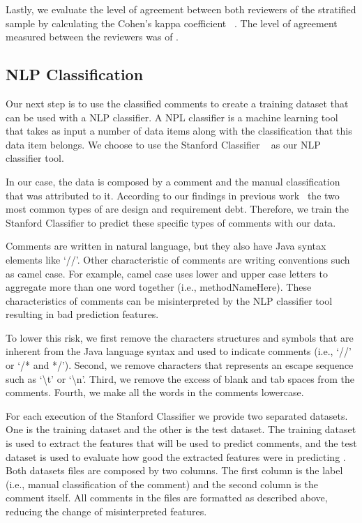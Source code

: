 Lastly, we evaluate the level of agreement between both reviewers of the stratified sample by calculating the Cohen's kappa coefficient ~\cite{cohen1960coefficient}. The level of agreement measured between the reviewers was of \todo{}.   
 

\subsection{NLP Classification} %
\label{sub:run_the_nlp_classifier}


Our next step is to use the classified \SATD comments to create a training dataset that can be used with a NLP classifier. A NPL classifier is a machine learning tool that takes as input a number of data items along with the classification that this data item belongs. We choose to use the Stanford Classifier ~\cite{Manning2014ACL} as our NLP classifier tool. 

In our case, the data is composed by a comment and the manual classification that was attributed to it. According to our findings in previous work~\cite{Maldonado2015MTD} the two most common types of \SATD are design and requirement debt. Therefore, we train the Stanford Classifier to predict these specific types of \SATD comments with our data.

Comments are written in natural language, but they also have Java syntax elements like `//'. Other characteristic of comments are writing conventions such as camel case. For example, camel case uses lower and upper case letters to aggregate more than one word together (i.e., methodNameHere). These characteristics of comments can be misinterpreted by the NLP classifier tool resulting in bad prediction features. 

To lower this risk, we first remove the characters structures and symbols that are inherent from the Java language syntax and used to indicate comments (i.e., `//' or `/* and */'). Second, we remove characters that represents an escape sequence such as `\textbackslash t' or `\textbackslash n'. Third, we remove the excess of blank and tab spaces from the comments. Fourth, we make all the words in the comments lowercase.

For each execution of the Stanford Classifier we provide two separated datasets. One is the training dataset and the other is the test dataset. The training dataset is used to extract the features that will be used to predict \SATD comments, and the test dataset is used to evaluate how good the extracted features were in predicting \SATD. Both datasets files are composed by two columns. The first column is the label (i.e., manual classification of the comment) and the second column is the comment itself. All comments in the files are formatted as described above, reducing the change of misinterpreted features. 

